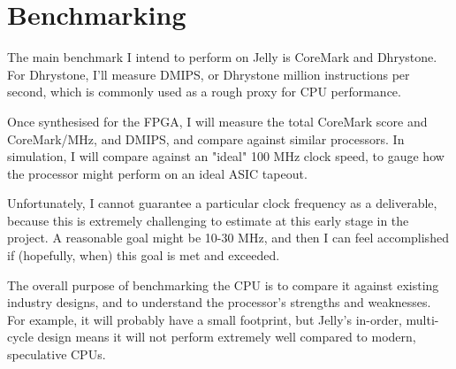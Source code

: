 \documentclass{article}
\begin{document}
%

\section{Benchmarking}
The main benchmark I intend to perform on Jelly is CoreMark and Dhrystone. For Dhrystone, I'll measure DMIPS,
or Dhrystone million instructions per second, which is commonly used as a rough proxy for CPU performance.

Once synthesised for the FPGA, I will measure the total CoreMark score and CoreMark/MHz, and DMIPS, and
compare against similar processors. In simulation, I will compare against an "ideal" 100 MHz clock speed, to
gauge how the processor might perform on an ideal ASIC tapeout.


Unfortunately, I cannot guarantee a particular clock frequency as a deliverable, because this is extremely
challenging to estimate at this early stage in the project. A reasonable goal might be 10-30 MHz, and then
I can feel accomplished if (hopefully, when) this goal is met and exceeded.

The overall purpose of benchmarking the CPU is to compare it against existing industry designs, and to 
understand the processor's strengths and weaknesses. For example, it will probably have a small footprint,
but Jelly's in-order, multi-cycle design means it will not perform extremely well compared to modern, speculative
CPUs.
\end{document}
